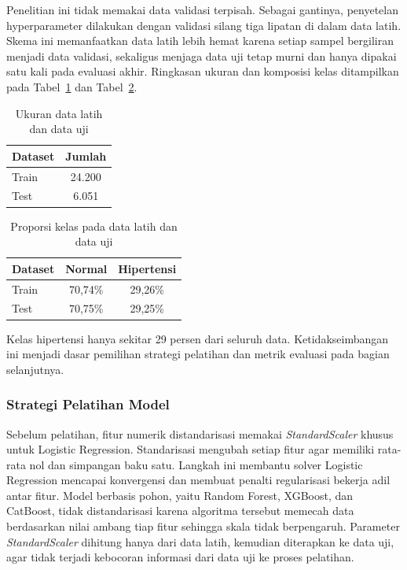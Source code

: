 Penelitian ini tidak memakai data validasi terpisah. Sebagai gantinya, penyetelan hyperparameter dilakukan dengan validasi silang tiga lipatan di dalam data latih. Skema ini memanfaatkan data latih lebih hemat karena setiap sampel bergiliran menjadi data validasi, sekaligus menjaga data uji tetap murni dan hanya dipakai satu kali pada evaluasi akhir. Ringkasan ukuran dan komposisi kelas ditampilkan pada Tabel~\ref{tab:ukuran-dataset} dan Tabel~\ref{tab:proporsi-kelas}.

\begin{table}[H]
\centering
\caption{Ukuran data latih dan data uji}
\label{tab:ukuran-dataset}
\begin{tabular}{lc}
\toprule
\textbf{Dataset} & \textbf{Jumlah} \\
\midrule
Train & 24.200 \\
Test  & 6.051 \\
\bottomrule
\end{tabular}
\end{table}

\begin{table}[H]
\centering
\caption{Proporsi kelas pada data latih dan data uji}
\label{tab:proporsi-kelas}
\begin{tabular}{lcc}
\toprule
\textbf{Dataset} & \textbf{Normal} & \textbf{Hipertensi} \\
\midrule
Train & 70,74\% & 29,26\% \\
Test  & 70,75\% & 29,25\% \\
\bottomrule
\end{tabular}
\end{table}

Kelas hipertensi hanya sekitar 29 persen dari seluruh data. Ketidakseimbangan ini menjadi dasar pemilihan strategi pelatihan dan metrik evaluasi pada bagian selanjutnya.

\subsubsection{Strategi Pelatihan Model}
\label{subsec:strategi-pelatihan}
Sebelum pelatihan, fitur numerik distandarisasi memakai \textit{StandardScaler} khusus untuk Logistic Regression. Standarisasi mengubah setiap fitur agar memiliki rata-rata nol dan simpangan baku satu. Langkah ini membantu solver Logistic Regression mencapai konvergensi dan membuat penalti regularisasi bekerja adil antar fitur. Model berbasis pohon, yaitu Random Forest, XGBoost, dan CatBoost, tidak distandarisasi karena algoritma tersebut memecah data berdasarkan nilai ambang tiap fitur sehingga skala tidak berpengaruh. Parameter \textit{StandardScaler} dihitung hanya dari data latih, kemudian diterapkan ke data uji, agar tidak terjadi kebocoran informasi dari data uji ke proses pelatihan.

